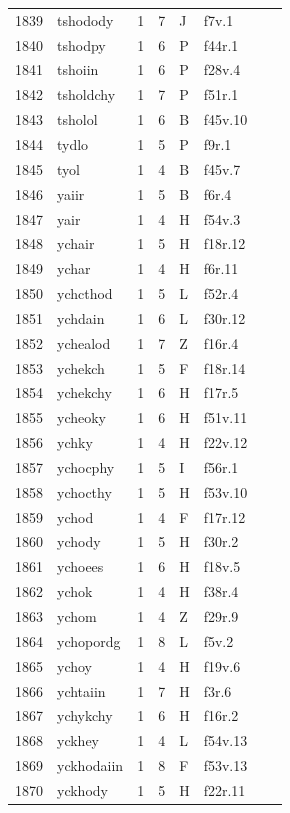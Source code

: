 \documentclass[11pt,a4paper]{article}
\begin{document}
\begin{landscape}
\begin{longtable}{@{}r>{\ttfamily}lrrl>{\ttfamily}l>{\raggedright\arraybackslash}p{80mm}>{\raggedright\arraybackslash}p{36mm}@{}}
1839 & tshodody & 1 & 7 & J & f7v.1 &  & \\
1840 & tshodpy & 1 & 6 & P & f44r.1 &  & \\
1841 & tshoiin & 1 & 6 & P & f28v.4 &  & \\
1842 & tsholdchy & 1 & 7 & P & f51r.1 &  & \\
1843 & tsholol & 1 & 6 & B & f45v.10 &  & \\
1844 & tydlo & 1 & 5 & P & f9r.1 &  & \\
1845 & tyol & 1 & 4 & B & f45v.7 &  & \\
1846 & yaiir & 1 & 5 & B & f6r.4 &  & \\
1847 & yair & 1 & 4 & H & f54v.3 &  & \\
1848 & ychair & 1 & 5 & H & f18r.12 &  & \\
1849 & ychar & 1 & 4 & H & f6r.11 &  & \\
1850 & ychcthod & 1 & 5 & L & f52r.4 &  & \\
1851 & ychdain & 1 & 6 & L & f30r.12 &  & \\
1852 & ychealod & 1 & 7 & Z & f16r.4 &  & \\
1853 & ychekch & 1 & 5 & F & f18r.14 &  & \\
1854 & ychekchy & 1 & 6 & H & f17r.5 &  & \\
1855 & ycheoky & 1 & 6 & H & f51v.11 &  & \\
1856 & ychky & 1 & 4 & H & f22v.12 &  & \\
1857 & ychocphy & 1 & 5 & I & f56r.1 &  & \\
1858 & ychocthy & 1 & 5 & H & f53v.10 &  & \\
1859 & ychod & 1 & 4 & F & f17r.12 &  & \\
1860 & ychody & 1 & 5 & H & f30r.2 &  & \\
1861 & ychoees & 1 & 6 & H & f18v.5 &  & \\
1862 & ychok & 1 & 4 & H & f38r.4 &  & \\
1863 & ychom & 1 & 4 & Z & f29r.9 &  & \\
1864 & ychopordg & 1 & 8 & L & f5v.2 &  & \\
1865 & ychoy & 1 & 4 & H & f19v.6 &  & \\
1866 & ychtaiin & 1 & 7 & H & f3r.6 &  & \\
1867 & ychykchy & 1 & 6 & H & f16r.2 &  & \\
1868 & yckhey & 1 & 4 & L & f54v.13 &  & \\
1869 & yckhodaiin & 1 & 8 & F & f53v.13 &  & \\
1870 & yckhody & 1 & 5 & H & f22r.11 &  & \\

\end{longtable}
\end{landscape}
\end{document}
